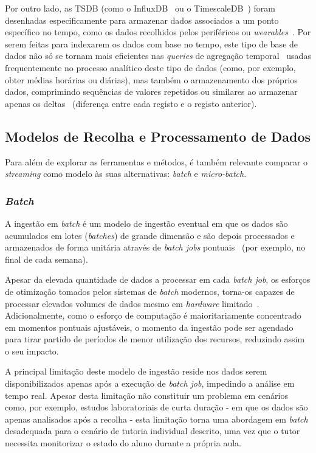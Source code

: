 Por outro lado, as \ac{TSDB} (como o InfluxDB~\cite{Influx_main} ou o TimescaleDB~\cite{Timescale_main}) foram desenhadas especificamente para armazenar dados associados a um ponto específico no tempo, como os dados recolhidos pelos periféricos ou \textit{wearables}~\cite{ClickHouse2025}.
Por serem feitas para indexarem os dados com base no tempo, este tipo de base de dados não só se tornam mais eficientes nas \textit{queries} de agregação temporal~\cite{ClickHouse2025} usadas frequentemente no processo analítico deste tipo de dados (como, por exemplo, obter médias horárias ou diárias), mas também o armazenamento dos próprios dados, comprimindo sequências de valores repetidos ou similares ao armazenar apenas os deltas~\cite{ClickHouse2025} (diferença entre cada registo e o registo anterior).

\subsection{Modelos de Recolha e Processamento de Dados}

Para além de explorar as ferramentas e métodos, é também relevante comparar o \textit{streaming} como modelo às suas alternativas: \textit{batch} e \textit{micro-batch}.

\subsubsection{\textit{Batch}}

A ingestão em \textit{batch} é um modelo de ingestão eventual em que os dados são acumulados em lotes (\textit{batches}) de grande dimensão e são depois processados e armazenados de forma unitária através de \textit{batch jobs} pontuais~\cite{Dendane2019} (por exemplo, no final de cada semana).

Apesar da elevada quantidade de dados a processar em cada \textit{batch job}, os esforços de otimização tomados pelos sistemas de \textit{batch} modernos, torna-os capazes de processar elevados volumes de dados mesmo em \textit{hardware} limitado~\cite{Akidau2018}.
Adicionalmente, como o esforço de computação é maioritariamente concentrado em momentos pontuais ajustáveis, o momento da ingestão pode ser agendado para tirar partido de períodos de menor utilização dos recursos, reduzindo assim o seu impacto.

A principal limitação deste modelo de ingestão reside nos dados serem disponibilizados apenas após a execução de \textit{batch job}, impedindo a análise em tempo real.
Apesar desta limitação não constituir um problema em cenários como, por exemplo, estudos laboratoriais de curta duração - em que os dados são apenas analisados após a recolha - esta limitação torna uma abordagem em \textit{batch} desadequada para o cenário de tutoria individual descrito, uma vez que o tutor necessita monitorizar o estado do aluno durante a própria aula.

